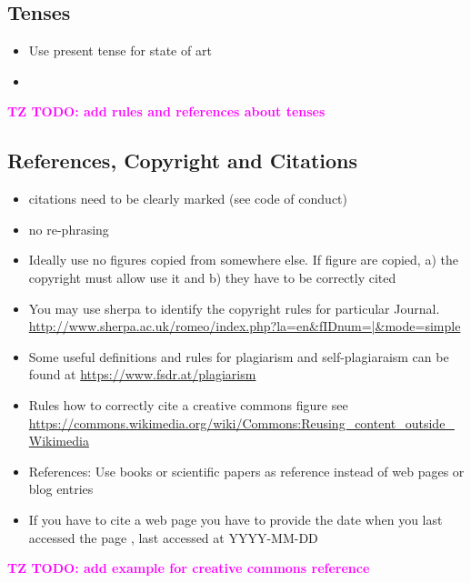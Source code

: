 


\subsection{Tenses}
\begin{itemize}
	\item Use present tense for state of art
	\item
\end{itemize}
\textcolor{magenta}{ \textbf{TZ TODO: add rules and references about tenses}}

	
\subsection{References, Copyright and Citations}
\begin{itemize}

	\item citations need to be clearly marked (see code of conduct)
	\item no re-phrasing 
	\item Ideally use no figures copied from somewhere else. If figure are copied, a) the copyright must allow use it and b) they have to be correctly cited
	\item You may use sherpa to identify the copyright rules for  particular Journal. \url{http://www.sherpa.ac.uk/romeo/index.php?la=en&fIDnum=|&mode=simple}
	\item Some useful definitions and rules for plagiarism and self-plagiaraism can be found at \url{https://www.fsdr.at/plagiarism}
	\item Rules how to correctly cite a creative commons figure
see \url{ https://commons.wikimedia.org/wiki/Commons:Reusing_content_outside_Wikimedia}
	\item References: Use books or scientific papers as reference instead of web pages or blog entries
	\item If you have to cite a web page you have to provide the date when you last accessed the page , last accessed at YYYY-MM-DD 
	
\end{itemize}
\textcolor{magenta}{\textbf{TZ TODO: add example for creative commons reference}}

